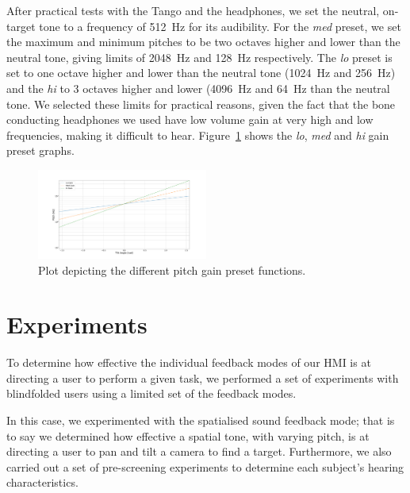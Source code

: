 \documentclass[format=sigconf, review=true, screen=true, anonymous=true]{acmart}
\begin{document}
After practical tests with the Tango and the headphones, we set the neutral, on-target tone to a frequency of \SI{512}{\hertz} for its audibility. For the \emph{med} preset, we set the maximum and minimum pitches to be two octaves higher and lower than the neutral tone, giving limits of \SI{2048}{\hertz} and \SI{128}{\hertz} respectively. The \emph{lo} preset is set to one octave higher and lower than the neutral tone (\SI{1024}{\hertz} and \SI{256}{\hertz}) and the \emph{hi} to 3 octaves higher and lower (\SI{4096}{\hertz} and \SI{64}{\hertz} than the neutral tone. We selected these limits for practical reasons, given the fact that the bone conducting headphones we used have low volume gain at very high and low frequencies, making it difficult to hear. Figure~\ref{fig:pitch-preset-plot} shows the \emph{lo}, \emph{med} and \emph{hi} gain preset graphs.  

\begin{figure}
  \centering
  \includegraphics[width=0.5\textwidth]{figures/pitch_gradient.pdf}
  \caption{Plot depicting the different pitch gain preset functions.}
  \label{fig:pitch-preset-plot}
\end{figure}

\section{Experiments}
\label{sec:experiments}

To determine how effective the individual feedback modes of our HMI is at directing a user to perform a given task, we performed a set of experiments with blindfolded users using a limited set of the feedback modes. %

In this case, we experimented with the spatialised sound feedback mode; that is to say we determined how effective a spatial tone, with varying pitch, is at directing a user to pan and tilt a camera to find a target. Furthermore, we also carried out a set of pre-screening experiments to determine each subject's hearing characteristics. %
\end{document}
